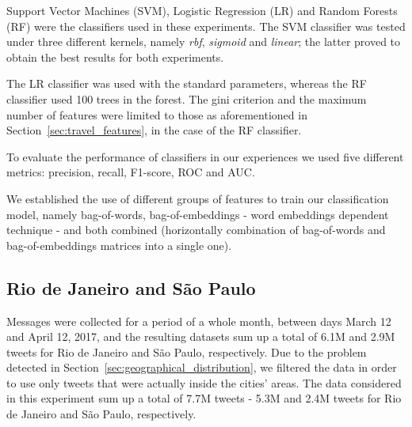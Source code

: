 Support Vector Machines (SVM), Logistic Regression (LR) and Random Forests (RF) were the classifiers used in these experiments. The SVM classifier was tested under three different kernels, namely \textit{rbf}, \textit{sigmoid} and \textit{linear}; the latter proved to obtain the best results for both experiments. 

The LR classifier was used with the standard parameters, whereas the RF classifier used 100 trees in the forest. The gini criterion and the maximum number of features were limited to those as aforementioned in Section~\ref{sec:travel_features}, in the case of the RF classifier.

To evaluate the performance of classifiers in our experiences we used five different metrics: precision, recall, F1-score, ROC and AUC.

We established the use of different groups of features to train our classification model, namely bag-of-words, bag-of-embeddings - word embeddings dependent technique - and both combined (horizontally combination of bag-of-words and bag-of-embeddings matrices into a single one).

\subsection{Rio de Janeiro and São Paulo}
\label{subsec:rio_de_janeiro_sao_paulo_experiment}

Messages were collected for a period of a whole month, between days March 12 and April 12, 2017, and the resulting datasets sum up a total of 6.1M and 2.9M tweets for Rio de Janeiro and São Paulo, respectively. Due to the problem detected in Section~\ref{sec:geographical_distribution}, we filtered the data in order to use only tweets that were actually inside the cities' areas. The data considered in this experiment sum up a total of 7.7M tweets -  5.3M and 2.4M tweets for Rio de Janeiro and São Paulo, respectively.

